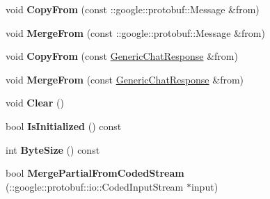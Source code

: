 \begin{DoxyCompactItemize}
\item 
\hypertarget{classSimpleChat_1_1GenericChatResponse_a9d9883cca317bbe081516a7ca46a516e}{void {\bfseries Copy\-From} (const \-::google\-::protobuf\-::\-Message \&from)}\label{classSimpleChat_1_1GenericChatResponse_a9d9883cca317bbe081516a7ca46a516e}

\item 
\hypertarget{classSimpleChat_1_1GenericChatResponse_a2a8fbf5f7d1166950df9853a7c596c21}{void {\bfseries Merge\-From} (const \-::google\-::protobuf\-::\-Message \&from)}\label{classSimpleChat_1_1GenericChatResponse_a2a8fbf5f7d1166950df9853a7c596c21}

\item 
\hypertarget{classSimpleChat_1_1GenericChatResponse_a0551253c17a771b8cd7bc4ff4a09ff81}{void {\bfseries Copy\-From} (const \hyperlink{classSimpleChat_1_1GenericChatResponse}{Generic\-Chat\-Response} \&from)}\label{classSimpleChat_1_1GenericChatResponse_a0551253c17a771b8cd7bc4ff4a09ff81}

\item 
\hypertarget{classSimpleChat_1_1GenericChatResponse_abe6dadf25acccc233524f6227e2994f0}{void {\bfseries Merge\-From} (const \hyperlink{classSimpleChat_1_1GenericChatResponse}{Generic\-Chat\-Response} \&from)}\label{classSimpleChat_1_1GenericChatResponse_abe6dadf25acccc233524f6227e2994f0}

\item 
\hypertarget{classSimpleChat_1_1GenericChatResponse_afb1f19ffa65529b74e622e291f38d075}{void {\bfseries Clear} ()}\label{classSimpleChat_1_1GenericChatResponse_afb1f19ffa65529b74e622e291f38d075}

\item 
\hypertarget{classSimpleChat_1_1GenericChatResponse_a3d6649eb8abf4d055ffe421273ec07de}{bool {\bfseries Is\-Initialized} () const }\label{classSimpleChat_1_1GenericChatResponse_a3d6649eb8abf4d055ffe421273ec07de}

\item 
\hypertarget{classSimpleChat_1_1GenericChatResponse_ac42eb1e8033396d861bd9b8ff139e5e9}{int {\bfseries Byte\-Size} () const }\label{classSimpleChat_1_1GenericChatResponse_ac42eb1e8033396d861bd9b8ff139e5e9}

\item 
\hypertarget{classSimpleChat_1_1GenericChatResponse_a1e7991aa5686baf276236982fd7dfd56}{bool {\bfseries Merge\-Partial\-From\-Coded\-Stream} (\-::google\-::protobuf\-::io\-::\-Coded\-Input\-Stream $\ast$input)}\label{classSimpleChat_1_1GenericChatResponse_a1e7991aa5686baf276236982fd7dfd56}


\end{DoxyCompactItemize}
